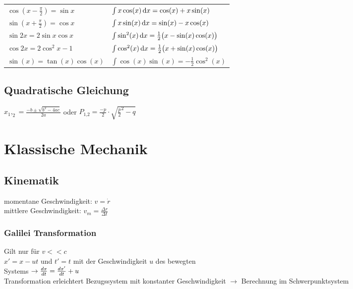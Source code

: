 \documentclass[fs, footer]{latex4ei}
\begin{document}
\begin{multicols*}{4}
\begin{tabular}{l  l}
 	$\cos (x - \frac{\pi}{2}) = \sin x$ & $\int x \cos(x) \diff x = \cos(x) + x \sin(x)$\\
 	
 	 $\sin (x + \frac{\pi}{2}) = \cos x$ & $\int x \sin(x) \diff x = \sin(x) - x \cos(x)$\\
 	
 	$\sin 2x = 2 \sin x \cos x $  & $\int \sin^2(x) \diff x = \frac12 \bigl(x - \sin(x)\cos(x) \bigr)$\\
     
 	$\cos 2x = 2\cos^2 x - 1$  & $\int \cos^2(x) \diff x = \frac12 \bigl(x + \sin(x)\cos(x) \bigr)$\\

 	$\sin(x) = \tan(x)\cos(x)$ & $\int \cos(x)\sin(x) = -\frac12 \cos^2(x)$ \\
\end{tabular}
\fi

\subsection{Quadratische Gleichung}
$x_1,_2 = \frac{-b \pm \sqrt{b^2 - 4ac}}{2a}$ oder $P_{\text{1,2}} = \frac{-p}{2}\cdot\sqrt{\frac{p}{2}^2 - q}$\\




\section{Klassische Mechanik}



\subsection{Kinematik}
momentane Geschwindigkeit: $v = \dot r$\\
mittlere Geschwindigkeit: $v_m = \frac{\Delta r}{\Delta t}$\\
\subsubsection{Galilei Transformation}
Gilt nur für $v<<c$\\
$x' = x - ut$ und $t' = t$ mit der Geschwindigkeit $u$ des bewegten \\Systems $\rightarrow \frac{dx}{dt} = \frac{dx'}{dt} + u$\\
Transformation erleichtert Bezugssystem mit konstanter Geschwindigkeit
$\rightarrow$ Berechnung im Schwerpunktsystem

\end{multicols*}
\end{document}
